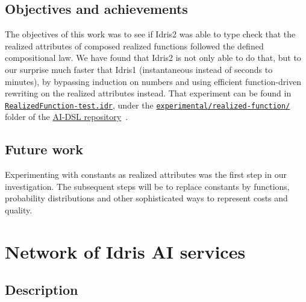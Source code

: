 \documentclass[]{report}
\begin{document}
\subsection{Objectives and achievements}

The objectives of this work was to see if Idris2 was able to type
check that the realized attributes of composed realized functions
followed the defined compositional law.  We have found that Idris2 is
not only able to do that, but to our surprise much faster that Idris1
(instantaneous instead of seconds to minutes), by bypassing induction
on numbers and using efficient function-driven rewriting on the
realized attributes instead.  That experiment can be found in
\href{https://github.com/singnet/ai-dsl/blob/master/experimental/realized-function/RealizedFunction-test.idr}{\texttt{RealizedFunction-test.idr}},
under the
\href{https://github.com/singnet/ai-dsl/blob/master/experimental/realized-function/}{\texttt{experimental/realized-function/}}
folder of the \href{https://github.com/singnet/ai-dsl/}{AI-DSL
  repository}~\cite{AIDSLRepo}.

\subsection{Future work}

Experimenting with constants as realized attributes was the first step
in our investigation.  The subsequent steps will be to replace
constants by functions, probability distributions and other
sophisticated ways to represent costs and quality.

\section{Network of Idris AI services}
\label{network_idris_ai_services}

\subsection{Description}
\end{document}
